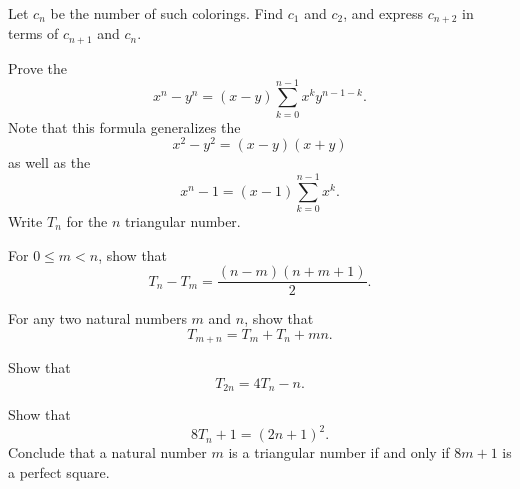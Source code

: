 \begin{starter}
\begin{center}
  \end{center}
  Let $c_n$ be the number of such colorings. Find $c_1$ and $c_2$, and express $c_{n+2}$ in terms of $c_{n+1}$ and $c_{n}$.
\end{starter}

\begin{routine}
  \exercise \label{exercise:difference-of-powers}
  Prove the 
  \begin{equation*}
    x^n-y^n=(x-y)\sum_{k=0}^{n-1}x^ky^{n-1-k}.
  \end{equation*}
  Note that this formula generalizes the 
  \begin{equation*}
    x^2-y^2 = (x-y)(x+y)
  \end{equation*}
  as well as the 
  \begin{equation*}
    x^n-1=(x-1)\sum_{k=0}^{n-1} x^k.
  \end{equation*}
  \exercise \label{exercise:identities-triangular-numbers}Write $T_n$ for the $n$\supth{} triangular number.
  \begin{subexenum}
  \item For $0\leq m<n$, show that
    \begin{equation*}
      T_n-T_m=\frac{(n-m)(n+m+1)}{2}.
    \end{equation*}
  \item For any two natural numbers $m$ and $n$, show that
    \begin{equation*}
      T_{m+n}=T_{m}+T_n+mn.
    \end{equation*}
  \item Show that
    \begin{equation*}
      T_{2n}=4T_n-n.
    \end{equation*}
  \item Show that
    \begin{equation*}
      8T_n+1=(2n+1)^2.
    \end{equation*}
    Conclude that a natural number $m$ is a triangular number if and only if $8m+1$ is a perfect square.

\end{subexenum}
\end{routine}
